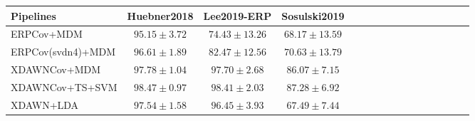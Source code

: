 \begin{tabular}{@{}lccccccccccccccc@{}}
\midrule 
Pipelines & Huebner2018 & Lee2019-ERP & Sosulski2019 \\
\midrule
ERPCov+MDM & $95.15\pm3.72$ & $74.43\pm13.26$ & $68.17\pm13.59$ \\
ERPCov(svdn4)+MDM & $96.61\pm1.89$ & $82.47\pm12.56$ & $70.63\pm13.79$ \\
XDAWNCov+MDM & $97.78\pm1.04$ & $97.70\pm2.68$ & $86.07\pm7.15$ \\
XDAWNCov+TS+SVM & \boldmath$98.47\pm0.97$ & \boldmath$98.41\pm2.03$ & \boldmath$87.28\pm6.92$ \\
XDAWN+LDA & $97.54\pm1.58$ & $96.45\pm3.93$ & $67.49\pm7.44$ \\\midrule 
\bottomrule
\end{tabular}


